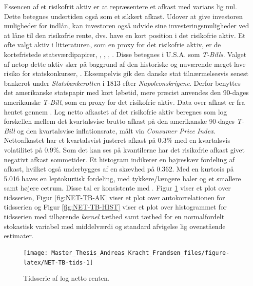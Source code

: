 \documentclass[
  a4paper,
  oneside]{memoir}
\begin{document}
Essencen af et risikofrit aktiv er at repræsentere et afkast med varians lig nul. Dette betegnes undertiden også som et sikkert afkast. Udover at give investoren muligheder for indlån, kan investoren også udvide sine investeringsmuligheder ved at låne til den risikofrie rente, dvs. have en kort position i det risikofrie aktiv. Et ofte valgt aktiv i litteraturen, som en proxy for det risikofrie aktiv, er de kortefristede statsværdipapirer, \citep{CampVic2003, CampVic1999}, \citep{JurVic2011}, \citep{Engsted2012}, \citep{CampVicCha2003}. Disse betegnes i U.S.A. som \emph{T-Bills}. Valget af netop dette aktiv sker på baggrund af den historiske og nuværende meget lave risiko for statskonkurser, \citep{Beers2017}. Eksempelvis gik den danske stat tilnærmelsesvis senest bankerot under \emph{Statsbankerotten} i 1813 efter \emph{Napoleonskrigene}. Derfor benyttes det amerikanske statspapir med kort løbetid, mere præcist anvendes den 90-dages amerikanske \emph{T-Bill}, som en proxy for det risikofrie aktiv. Data over afkast er fra \citep{CRSPt90} hentet gennem \citep{WRDSt90}. Log netto afkastet af det risikofrie aktiv beregnes som log forskellen mellem det kvartalsvise brutto afkast på den amerikanske 90-dages \emph{T-Bill} og den kvartalsvise inflationsrate, målt via \emph{Consumer Price Index}. Nettoafkastet har et kvartalsvist justeret afkast på 0.3\(\%\) med en kvartalsvis volatilitet på 0.9\(\%\). Som det kan ses på kvantilerne har det risikofrie afkast givet negativt afkast sommetider. Et histogram indikerer en højreskæv fordeling af afkast, hvilket også underbygges af en skævhed på 0.362. Med en kurtosis på 5.016 haves en leptokurtisk fordeling, med tykkere/længere haler og et smallere samt højere cetrum. Disse tal er konsistente med \citep{CampVic2003}. Figur \ref{fig:NET-TB-tids} viser et plot over tidsserien, Figur \ref{fig:NET-TB-AK} viser et plot over autokorrelationen for tidsserien og Figur \ref{fig:NET-TB-HIST} viser et plot over histogrammet for tidsserien med tilhørende \emph{kernel} tæthed samt tæthed for en normalfordelt stokastisk variabel med middelværdi og standard afvigelse lig ovenstående estimater.

\begin{figure}[H]

{\centering \texttt{[image: Master\_Thesis\_Andreas\_Kracht\_Frandsen\_files/figure-latex/NET-TB-tids-1]} 

}

\caption[Tidsserie af log netto renten.]{Tidsserie af log netto renten.}\label{fig:NET-TB-tids}
\end{figure}
\end{document}
